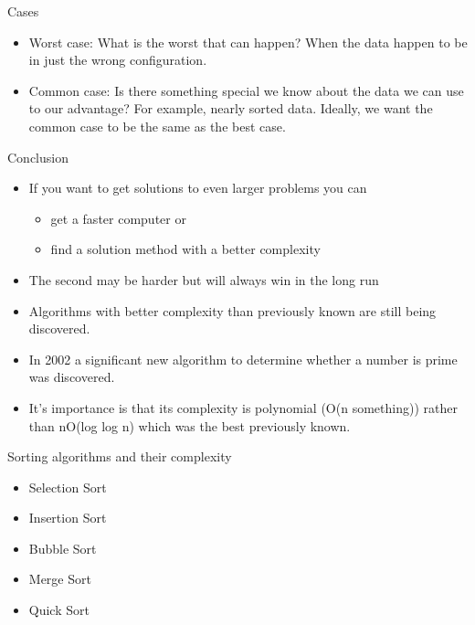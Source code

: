 \documentclass{beamer}
\begin{document}
\begin{frame}
\end{frame} \begin{frame} 

Cases

\begin{itemize}
\item Worst case: What is the worst that can happen? When the data happen to be in just the wrong configuration.
\item Common case: Is there something special we know about the data we can use to our advantage? For example, nearly
sorted data. Ideally, we want the common case to be the same as the best case.
\end{itemize}

\end{frame} 

\begin{frame}

Conclusion

\begin{itemize}
\item If you want to get solutions to even larger problems you can

\begin{itemize}
\item get a faster computer or
\item find a solution method with a better complexity
\end{itemize}
\item The second may be harder but will always win in the long run
\item Algorithms with better complexity than previously known are still being discovered.
\item In 2002 a significant new algorithm to determine whether a number is prime was discovered.
\item It's importance is that its complexity is polynomial (O(n something)) rather than nO(log log n) which was the best
previously known.
\end{itemize}

\end{frame} \begin{frame}

Sorting algorithms and their complexity

\begin{itemize}
\item Selection Sort
\item Insertion Sort 
\item Bubble Sort 
\item Merge Sort 
\item Quick Sort
\end{itemize}


\end{frame}
\end{document}
